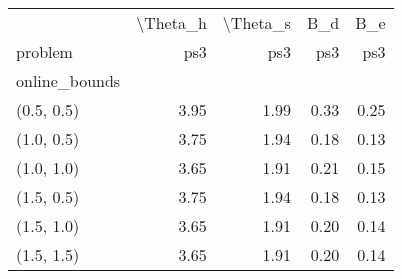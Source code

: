 \begin{tabular}{lrrrr}
\toprule
{} & \textbackslash Theta\_h & \textbackslash Theta\_s &  B\_d &  B\_e \\
problem &      ps3 &      ps3 &  ps3 &  ps3 \\
online\_bounds &          &          &      &      \\
\midrule
(0.5, 0.5)    &     3.95 &     1.99 & 0.33 & 0.25 \\
(1.0, 0.5)    &     3.75 &     1.94 & 0.18 & 0.13 \\
(1.0, 1.0)    &     3.65 &     1.91 & 0.21 & 0.15 \\
(1.5, 0.5)    &     3.75 &     1.94 & 0.18 & 0.13 \\
(1.5, 1.0)    &     3.65 &     1.91 & 0.20 & 0.14 \\
(1.5, 1.5)    &     3.65 &     1.91 & 0.20 & 0.14 \\
\bottomrule
\end{tabular}

